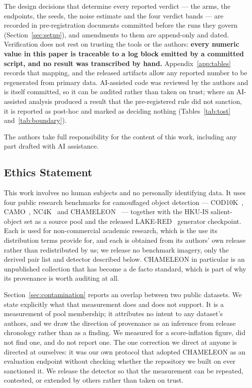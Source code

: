 \documentclass{article} %
\begin{document}
The design decisions that determine every reported verdict --- the arms, the endpoints, the seeds,
the noise estimate and the four verdict bands --- are recorded in pre-registration documents
committed before the runs they govern (Section~\ref{sec:setup}), and amendments to them are
append-only and dated. Verification does not rest on trusting the tools or the authors:
\textbf{every numeric value in this paper is traceable to a log block emitted by a committed script,
and no result was transcribed by hand.} Appendix~\ref{app:tables} records that mapping, and the
released artifacts allow any reported number to be regenerated from primary data. AI-assisted code
was reviewed by the authors and is itself committed, so it can be audited rather than taken on
trust; where an AI-assisted analysis produced a result that the pre-registered rule did not
sanction, it is reported as post-hoc and marked as deciding nothing
(Tables~\ref{tab:tost} and~\ref{tab:boundary}).

The authors take full responsibility for the content of this work, including any part drafted with
AI assistance.

\subsection*{Ethics Statement}

This work involves no human subjects and no personally identifying data. It uses four public
research benchmarks for camouflaged object detection --- COD10K~\cite{fan2022concealed},
CAMO~\cite{le2019anabranch}, NC4K~\cite{lv2021simultaneously} and
CHAMELEON~\cite{skurowski2018animal} --- together with the HKU-IS salient-object set as a source
pool and the released LAKE-RED~\cite{zhao2024lakered} generator checkpoint. Each is used for
non-commercial academic research, which is the use its distribution terms provide for, and each is
obtained from its authors' own release rather than redistributed by us; we release no benchmark
imagery, only the derived pair list and detector described below.
CHAMELEON in particular is an unpublished collection that has become a de facto standard, which is
part of why its provenance is worth auditing at all.

Section~\ref{sec:contamination} reports an overlap between two public datasets. We state explicitly
what that measurement does and does not support. It is a measurement of pool membership; it attributes
no intent to any dataset's authors, and we draw the direction of provenance as an inference from
release chronology rather than as a finding. We measured for a score-inflation figure, did not find
one, and do not report one. The one correction we direct at anyone is directed at ourselves: it was
our own protocol that adopted CHAMELEON as an evaluation endpoint without checking whether the
repository we built on ever sanctioned it. We release the detector so that the measurement can be
repeated, contested, or extended by others rather than taken on trust.
\end{document}
